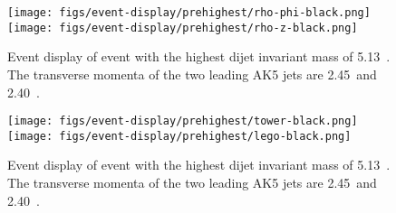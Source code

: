 \begin{figure}[htb]
\begin{center}
\texttt{[image: figs/event-display/prehighest/rho-phi-black.png]}
\texttt{[image: figs/event-display/prehighest/rho-z-black.png]}
\end{center}
\caption{Event display of event with the highest dijet invariant mass of 5.13~\TeVcc .
The transverse momenta of the two leading AK5 jets are 2.45~\TeVcc and 2.40~\TeVcc .
}
\label{fig:eventdisplay13}
\end{figure}

\begin{figure}[htb]
\begin{center}
\texttt{[image: figs/event-display/prehighest/tower-black.png]}
\texttt{[image: figs/event-display/prehighest/lego-black.png]}
\end{center}
\caption{Event display of event with the highest dijet invariant mass of 5.13~\TeVcc .
The transverse momenta of the two leading AK5 jets are 2.45~\TeVcc and 2.40~\TeVcc .
}
\label{fig:eventdisplay14}
\end{figure}

\clearpage


